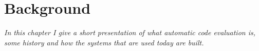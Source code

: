 \chapter{Background}

\textit{In this chapter I give a short presentation of what automatic code evaluation is, some history and how the systems that are used today are built.}






